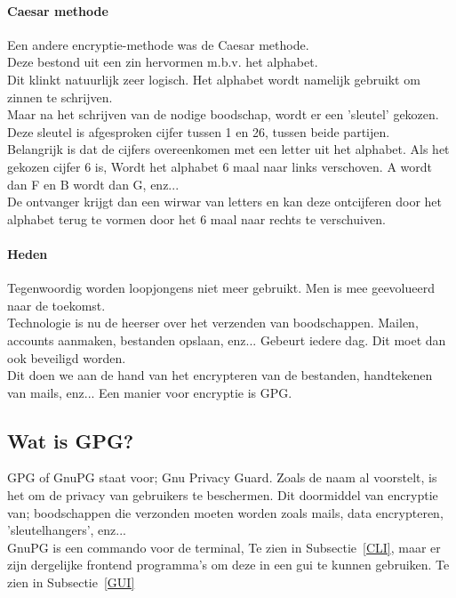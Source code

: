 \documentclass[12pt]{article}
\begin{document}
			\paragraph{Caesar methode}
				Een andere encryptie-methode was de Caesar methode.\\
				Deze bestond uit een zin hervormen m.b.v. het alphabet.\\ 
				Dit klinkt natuurlijk zeer logisch.
				Het alphabet wordt namelijk gebruikt om zinnen te schrijven.\\
				Maar na het schrijven van de nodige boodschap, wordt er een 'sleutel' gekozen. Deze 					sleutel is afgesproken cijfer tussen 1 en 26, tussen beide partijen.\\
				Belangrijk is dat de cijfers overeenkomen met een letter uit het alphabet. Als het 						gekozen cijfer 6 is, Wordt het alphabet 6 maal naar links verschoven. A wordt dan F 					en B wordt dan G, enz...\\
				De ontvanger krijgt dan een wirwar van letters en kan deze ontcijferen door het 						alphabet terug te vormen door het 6 maal naar rechts te verschuiven.\\

			\newpage
			\paragraph{Heden}
				Tegenwoordig worden loopjongens niet meer gebruikt. Men is mee geevolueerd naar de 						toekomst.\\
				Technologie is nu de heerser over het verzenden van boodschappen.
				Mailen, accounts aanmaken, bestanden opslaan, enz... Gebeurt iedere dag. Dit moet dan 					ook beveiligd worden.\\
				Dit doen we aan de hand van het encrypteren van de bestanden, handtekenen van mails,
				enz...
				Een manier voor encryptie is GPG.

			\newpage
			\subsection{Wat is GPG?}
				GPG of GnuPG staat voor; Gnu Privacy Guard. Zoals de naam al voorstelt, is het om de 					privacy van gebruikers te beschermen. Dit doormiddel van encryptie van; boodschappen 					die verzonden moeten worden zoals mails, data encrypteren, 'sleutelhangers', enz... 					\\
				GnuPG is een commando voor de terminal, Te zien in Subsectie~\ref{CLI}, maar er zijn 					dergelijke frontend programma's om deze in een gui te kunnen gebruiken. Te zien in 						Subsectie~\ref{GUI}
\end{document}
